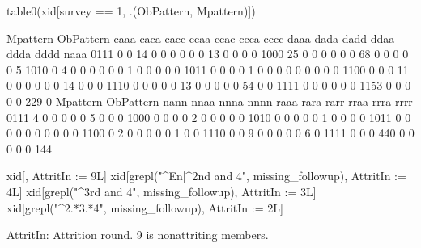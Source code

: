 \begin{Schunk}
\begin{Sinput}
table0(xid[survey == 1, .(ObPattern, Mpattern)])
\end{Sinput}
\begin{Soutput}
         Mpattern
ObPattern caaa caca cacc ccaa ccac ccca cccc daaa dada dadd ddaa ddda dddd naaa
     0111    0    0   14    0    0    0    0    0    0   13    0    0    0    0
     1000   25    0    0    0    0    0    0   68    0    0    0    0    0    5
     1010    0    4    0    0    0    0    0    0    1    0    0    0    0    0
     1011    0    0    0    0    1    0    0    0    0    0    0    0    0    0
     1100    0    0    0   11    0    0    0    0    0    0   14    0    0    0
     1110    0    0    0    0    0   13    0    0    0    0    0   54    0    0
     1111    0    0    0    0    0    0 1153    0    0    0    0    0  229    0
         Mpattern
ObPattern nann nnaa nnna nnnn raaa rara rarr rraa rrra rrrr
     0111    4    0    0    0    0    0    5    0    0    0
     1000    0    0    0    0    2    0    0    0    0    0
     1010    0    0    0    0    0    1    0    0    0    0
     1011    0    0    0    0    0    0    0    0    0    0
     1100    0    2    0    0    0    0    0    1    0    0
     1110    0    0    9    0    0    0    0    0    6    0
     1111    0    0    0  440    0    0    0    0    0  144
\end{Soutput}
\begin{Sinput}
xid[, AttritIn := 9L]
xid[grepl("^En|^2nd and 4", missing_followup), AttritIn := 4L]
xid[grepl("^3rd and 4", missing_followup), AttritIn := 3L]
xid[grepl("^2.*3.*4", missing_followup), AttritIn := 2L]
\end{Sinput}
\end{Schunk}
\textsf{AttritIn}: Attrition round. 9 is nonattriting members.
